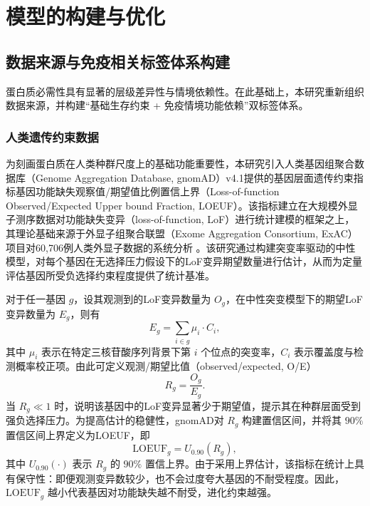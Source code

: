 
\chapter{模型的构建与优化}

\section{数据来源与免疫相关标签体系构建}
蛋白质必需性具有显著的层级差异性与情境依赖性。在此基础上，本研究重新组织数据来源，并构建“基础生存约束 + 免疫情境功能依赖”双标签体系。
\subsection{人类遗传约束数据}
为刻画蛋白质在人类种群尺度上的基础功能重要性，本研究引入人类基因组聚合数据库（Genome Aggregation Database, gnomAD）v4.1提供的基因层面遗传约束指标基因功能缺失观察值/期望值比例置信上界（Loss-of-function Observed/Expected Upper bound Fraction, LOEUF）\cite{karczewski2020mutational}。该指标建立在大规模外显子测序数据对功能缺失变异（loss-of-function, LoF）进行统计建模的框架之上，其理论基础来源于外显子组聚合联盟（Exome Aggregation Consortium, ExAC）项目对60,706例人类外显子数据的系统分析 \cite{lek2016protein}。该研究通过构建突变率驱动的中性模型，对每个基因在无选择压力假设下的LoF变异期望数量进行估计，从而为定量评估基因所受负选择约束程度提供了统计基准。

对于任一基因 $g$，设其观测到的LoF变异数量为 $O_g$，在中性突变模型下的期望LoF变异数量为 $E_g$，则有
\begin{equation}
    E_g = \sum_{i \in g} \mu_i \cdot C_i,    
\end{equation}
其中 $\mu_i$ 表示在特定三核苷酸序列背景下第 $i$ 个位点的突变率，$C_i$ 表示覆盖度与检测概率校正项。由此可定义观测/期望比值（observed/expected, O/E）
\begin{equation}
    R_g = \frac{O_g}{E_g}.
\end{equation}
当 $R_g \ll 1$ 时，说明该基因中的LoF变异显著少于期望值，提示其在种群层面受到强负选择压力。为提高估计的稳健性，gnomAD对 $R_g$ 构建置信区间，并将其 $90\%$ 置信区间上界定义为LOEUF，即
\begin{equation}
    \mathrm{LOEUF}_g = U_{0.90}(R_g),
\end{equation}
其中 $U_{0.90}(\cdot)$ 表示 $R_g$ 的 $90\%$ 置信上界。由于采用上界估计，该指标在统计上具有保守性：即便观测变异数较少，也不会过度夸大基因的不耐受程度。因此，$\mathrm{LOEUF}_g$ 越小代表基因对功能缺失越不耐受，进化约束越强。

